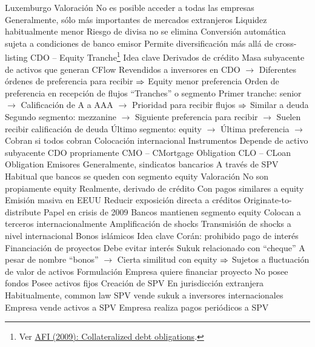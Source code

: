 \documentclass{nuevotema}
\begin{document}
\begin{esquemal}
				\4 Luxemburgo
			\3 Valoración
				\4 No es posible acceder a todas las empresas
				\4[] Generalmente, sólo más importantes de mercados extranjeros
				\4 Liquidez habitualmente menor
				\4 Riesgo de divisa no se elimina
				\4[] Conversión automática sujeta a condiciones de banco emisor
				\4 Permite diversificación más allá de cross-listing
		\2 CDO -- Equity Tranche\footnote{Ver \href{http://www.afi.es/EO/CDOs.pdf}{AFI (2009): Collateralized debt obligations}.}
			\3 Idea clave
				\4 Derivados de crédito
				\4 Masa subyacente de activos que generan CFlow
				\4[] Revendidos a inversores en CDO
				\4[] $\to$ Diferentes órdenes de preferencia para recibir
				\4[] $\Rightarrow$ Equity menor preferencia
				\4 Orden de preferencia en recepción de flujos
				\4[] ``Tranches'' o segmento
				\4[] Primer tranche: senior
				\4[] $\to$ Calificación de A a AAA
				\4[] $\to$ Prioridad para recibir flujos
				\4[] $\Rightarrow$ Similar a deuda
				\4[] Segundo segmento: mezzanine
				\4[] $\to$ Siguiente preferencia para recibir
				\4[] $\to$ Suelen recibir calificación de deuda
				\4[] Último segmento: equity
				\4[] $\to$ Última preferencia
				\4[] $\to$ Cobran si todos cobran
				\4 Colocación internacional
			\3 Instrumentos
				\4 Depende de activo subyacente
				\4 CDO propriamente
				\4 CMO -- CMortgage Obligation
				\4 CLO -- CLoan Obligation
			\3 Emisores
				\4 Generalmente, sindicatos bancarios
				\4 A través de SPV
				\4 Habitual que bancos se queden con segmento equity
			\3 Valoración
				\4 No son propiamente equity
				\4 Realmente, derivado de crédito
				\4[] Con pagos similares a equity
				\4 Emisión masiva en EEUU
				\4[] Reducir exposición directa a créditos
				\4[] Originate-to-distribute
				\4 Papel en crisis de 2009
				\4[] Bancos mantienen segmento equity
				\4[] Colocan a terceros internacionalmente
				\4[] Amplificación de shocks
				\4 Transmisión de shocks a nivel internacional
		\2 Bonos islámicos
			\3 Idea clave
				\4 Corán: prohibido pago de interés
				\4 Financiación de proyectos
				\4[] Debe evitar interés
				\4 Sukuk
				\4[] relacionado con ``cheque''
				\4 A pesar de nombre ``bonos''
				\4[] $\to$ Cierta similitud con equity
				\4[] $\Rightarrow$ Sujetos a fluctuación de valor de activos
			\3 Formulación
				\4 Empresa quiere financiar proyecto
				\4[] No posee fondos
				\4[] Posee activos fijos
				\4 Creación de SPV
				\4[] En jurisdicción extranjera
				\4[] Habitualmente, common law
				\4 SPV vende sukuk a inversores internacionales
				\4 Empresa vende activos a SPV
				\4 Empresa realiza pagos periódicos a SPV

\end{esquemal}
\end{document}
